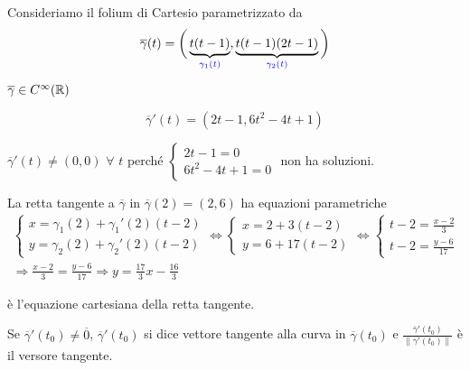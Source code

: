 \begin{exbar}
\begin{example}
	Consideriamo il folium di Cartesio parametrizzato da 
	\begin{equation*}
		\overline{\gamma}(t)=\bigg( \underbrace{t(t-1)}_{{\color{blue} \gamma_1(t)}},\underbrace{t(t-1)(2t-1)}_{{\color{blue} \gamma_2(t)}} \bigg)
	\end{equation*}
	
	$\overline{\gamma}\in C^\infty(\mathbb{R})$
	
	\begin{equation*}
		\overline{\gamma}' (t)=(2t-1,6t^2-4t+1)
	\end{equation*}
	
	$\overline{\gamma}' (t) \neq (0,0)\,\, \forall\,\, t$ perché 
	$\begin{cases}
		2t-1=0\\
		6t^2-4t+1=0
	\end{cases}$ non ha soluzioni.
	
	La retta tangente a $\overline{\gamma}$ in $\overline{\gamma}(2)=(2,6)$ ha equazioni parametriche
	\begin{gather*}
		\begin{cases}
			x=\gamma_1(2)+\gamma_1'(2)(t-2)\\
			y=\gamma_2(2)+\gamma_2'(2)(t-2)
		\end{cases}
		\Leftrightarrow 
		\begin{cases}
			x=2+3(t-2)\\
			y=6+17(t-2)
		\end{cases} \Leftrightarrow
		\begin{cases}
			t-2=\frac{x-2}{3}\\
			t-2=\frac{y-6}{17}
		\end{cases}
		\\
		\Rightarrow \frac{x-2}{3}=\frac{y-6}{17} \Rightarrow y=\frac{17}{3}x-\frac{16}{3}
	\end{gather*}
	
	è l'equazione cartesiana della retta tangente.
\end{example}
\end{exbar}


\begin{definition}
	Se $\overline{\gamma}'(t_0)\neq \overline{0}$, $\overline{\gamma}'(t_0)$ si dice vettore tangente alla curva in $\overline{\gamma}(t_0)$ e $\frac{\overline{\gamma}'(t_0)}{\|\overline{\gamma}'(t_0)\|}$ è il versore tangente.
\end{definition}


